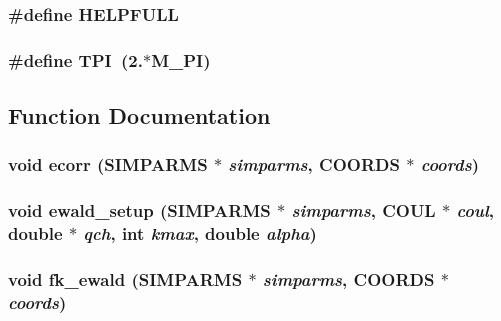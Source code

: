 \subsubsection{\setlength{\rightskip}{0pt plus 5cm}\#define HELPFULL}\label{md__ewald_8c_81afe6ee1b2fd97ae32c3577281c36d5}


\subsubsection{\setlength{\rightskip}{0pt plus 5cm}\#define TPI~(2.$\ast$M\_\-PI)}\label{md__ewald_8c_8b4dd00016aed25a0ea54e9a9acd1239}




\subsection{Function Documentation}
\subsubsection{\setlength{\rightskip}{0pt plus 5cm}void ecorr ({\bf SIMPARMS} $\ast$ {\em simparms}, {\bf COORDS} $\ast$ {\em coords})}\label{md__ewald_8c_ec5c160d4415b8139b9994c48d69e763}


\subsubsection{\setlength{\rightskip}{0pt plus 5cm}void ewald\_\-setup ({\bf SIMPARMS} $\ast$ {\em simparms}, {\bf COUL} $\ast$ {\em coul}, double $\ast$ {\em qch}, int {\em kmax}, double {\em alpha})}\label{md__ewald_8c_db29d7182ce26e819ca8bb578c9dea1e}


\subsubsection{\setlength{\rightskip}{0pt plus 5cm}void fk\_\-ewald ({\bf SIMPARMS} $\ast$ {\em simparms}, {\bf COORDS} $\ast$ {\em coords})}\label{md__ewald_8c_87c62619017d824430b8e0080d3791aa}


